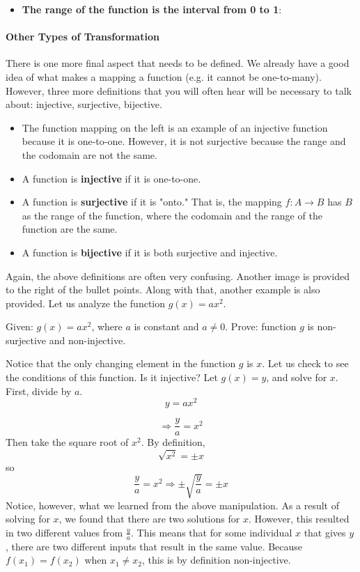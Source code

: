 \begin{itemize}
    \item \textbf{The range of the function is the interval from 0 to 1}:
\end{itemize}

\paragraph{Other Types of Transformation}

There is one more final aspect that needs to be defined. We already have a good idea of what makes a mapping a function (e.g. it cannot be one-to-many). However, three more definitions that you will often hear will be necessary to talk about: injective, surjective, bijective.


\begin{itemize}
    \item The function mapping on the left is an example of an injective function because it is one-to-one. However, it is not surjective because the range and the codomain are not the same.
    \item A function is \textbf{injective} if it is one-to-one.
    \item A function is \textbf{surjective} if it is "onto." That is, the mapping $f:A \to B$ has $B$ as the range of the function, where the codomain and the range of the function are the same.
    \item A function is \textbf{bijective} if it is both surjective and injective.
\end{itemize}

Again, the above definitions are often very confusing. Another image is provided to the right of the bullet points. Along with that, another example is also provided. Let us analyze the function $g(x) = ax^2$.

Given: $g(x) = ax^2$, where $a$ is constant and $a \neq 0$.
Prove: function $g$ is non-surjective and non-injective.

Notice that the only changing element in the function $g$ is $x$. Let us check to see the conditions of this function.
Is it injective? Let $g(x) = y$, and solve for $x$. First, divide by $a$.
$$
y = ax^2
$$

$$
\Rightarrow \frac{y}{a} = x^2
$$
Then take the square root of $x^2$. By definition, 
$$
\sqrt{x^2} = \pm x
$$
so
$$
\frac{y}{a} = x^2 \Rightarrow \pm \sqrt{\frac{y}{a}} = \pm x
$$
Notice, however, what we learned from the above manipulation. As a result of solving for $x$, we found that there are two solutions for $x$. However, this resulted in two different values from $\frac{y}{a}$. This means that for some individual $x$ that gives $y$, there are two different inputs that result in the same value. Because $f(x_1) = f(x_2)$ when $x_1 \neq x_2$, this is by definition non-injective.

